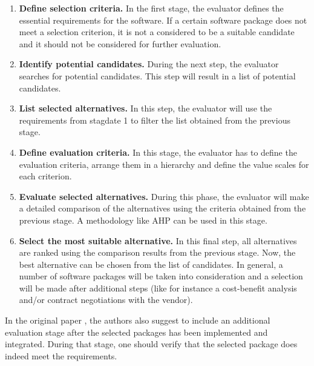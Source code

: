 \begin{enumerate}
    \item \textbf{Define selection criteria.} In the first stage, the evaluator defines the essential requirements for the software. If a certain software package does not meet a selection criterion, it is not a considered to be a suitable candidate and it should not be considered for further evaluation. 
    \item \textbf{Identify potential candidates.} During the next step, the evaluator searches for potential candidates. This step will result in a list of potential candidates.
    \item \textbf{List selected alternatives.} In this step, the evaluator will use the requirements from stagdate 1 to filter the list obtained from the previous stage. 
    \item \textbf{Define evaluation criteria.} In this stage, the evaluator has to define the evaluation criteria, arrange them in a hierarchy and define the value scales for each criterion. 
    \item \textbf{Evaluate selected alternatives.} During this phase, the evaluator will make a detailed comparison of the alternatives using the criteria obtained from the previous stage. A methodology like AHP can be used in this stage.
    \item \textbf{Select the most suitable alternative.} In this final step, all alternatives are ranked using the comparison results from the previous stage. Now, the best alternative can be chosen from the list of candidates. In general, a number of software packages will be taken into consideration and a selection will be made after additional steps (like for instance a cost-benefit analysis and/or contract negotiations with the vendor). 
\end{enumerate}

In the original paper \cite{Jadhav:2009}, the authors also suggest to include an additional evaluation stage after the selected packages has been implemented and integrated. During that stage, one should verify that the selected package does indeed meet the requirements.

